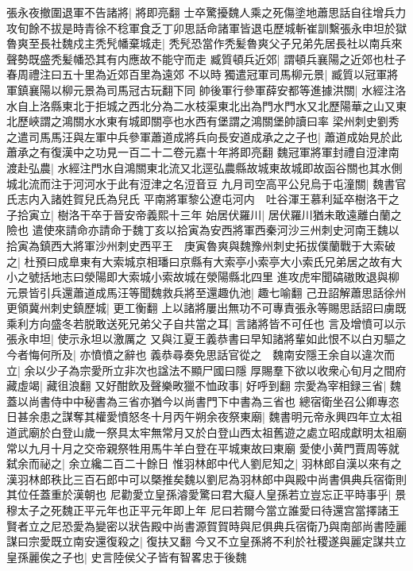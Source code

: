 張永夜撤圍退軍不告諸將|{
	將即亮翻}
士卒驚擾魏人乘之死傷塗地蕭思話自往增兵力攻旬餘不拔是時青徐不稔軍食乏丁卯思話命諸軍皆退屯歷城斬崔訓繫張永申坦於獄魯爽至長社魏戍主秃髠幡棄城走|{
	秃髠恐當作秃髪魯爽父子兄弟先居長社以南兵來聲勢既盛秃髪幡恐其有内應故不能守而走}
臧質頓兵近郊|{
	謂頓兵襄陽之近郊也杜子春周禮注曰五十里為近郊百里為遠郊}
不以時獨遣冠軍司馬柳元景|{
	臧質以冠軍將軍鎮襄陽以柳元景為司馬冠古玩翻下同}
帥後軍行參軍薛安都等進據洪關|{
	水經注洛水自上洛縣東北于拒城之西北分為二水枝渠東北出為門水門水又北歷陽華之山又東北歷峽謂之鴻關水水東有城即關亭也水西有堡謂之鴻關堡帥讀曰率}
梁州刺史劉秀之遣司馬馬汪與左軍中兵參軍蕭道成將兵向長安道成承之之子也|{
	蕭道成始見於此蕭承之有復漢中之功見一百二十二卷元嘉十年將即亮翻}
魏冠軍將軍封禮自浢津南渡赴弘農|{
	水經注門水自鴻關東北流又北逕弘農縣故城東故城即故函谷關也其水側城北流而注于河河水于此有浢津之名浢音豆}
九月司空高平公兒烏于屯潼關|{
	魏書官氏志内入諸姓賀兒氏為兒氏}
平南將軍黎公遼屯河内　吐谷渾王慕利延卒樹洛干之子拾寅立|{
	樹洛干卒于晉安帝義熙十三年}
始居伏羅川|{
	居伏羅川猶未敢遠離白蘭之險也}
遣使來請命亦請命于魏丁亥以拾寅為安西將軍西秦河沙三州刺史河南王魏以拾寅為鎮西大將軍沙州刺史西平王　庚寅魯爽與魏豫州刺史拓拔僕蘭戰于大索破之|{
	杜預曰成臯東有大索城京相璠曰京縣有大索亭小索亭大小索氏兄弟居之故有大小之號括地志曰滎陽即大索城小索故城在滎陽縣北四里}
進攻虎牢聞碻磝敗退與柳元景皆引兵還蕭道成馬汪等聞魏救兵將至還趣仇池|{
	趣七喻翻}
己丑詔解蕭思話徐州更領冀州刺史鎮歷城|{
	更工衡翻}
上以諸將屢出無功不可專責張永等賜思話詔曰虜既乘利方向盛冬若脱敢送死兄弟父子自共當之耳|{
	言諸將皆不可任也}
言及增憤可以示張永申坦|{
	使示永坦以激厲之}
又與江夏王義恭書曰早知諸將輩如此恨不以白刃驅之今者悔何所及|{
	亦憤憤之辭也}
義恭尋奏免思話官從之　魏南安隱王余自以違次而立|{
	余以少子為宗愛所立非次也諡法不顯尸國曰隱}
厚賜羣下欲以收衆心旬月之間府藏虛竭|{
	藏徂浪翻}
又好酣飲及聲樂畋獵不恤政事|{
	好呼到翻}
宗愛為宰相録三省|{
	魏蓋以尚書侍中中秘書為三省亦猶今以尚書門下中書為三省也}
總宿衛坐召公卿專恣日甚余患之謀奪其權愛憤怒冬十月丙午朔余夜祭東廟|{
	魏書明元帝永興四年立太祖道武廟於白登山歲一祭具太牢無常月又於白登山西太祖舊遊之處立昭成獻明太祖廟常以九月十月之交帝親祭牲用馬牛羊白登在平城東故曰東廟}
愛使小黄門賈周等就弑余而祕之|{
	余立纔二百二十餘日}
惟羽林郎中代人劉尼知之|{
	羽林郎自漢以來有之漢羽林郎秩比三百石郎中可以槩推矣魏以劉尼為羽林郎中與殿中尚書俱典兵宿衛則其位任蓋重於漢朝也}
尼勸愛立皇孫濬愛驚曰君大癡人皇孫若立豈忘正平時事乎|{
	景穆太子之死魏正平元年也正平元年即上年}
尼曰若爾今當立誰愛曰待還宫當擇諸王賢者立之尼恐愛為變密以狀告殿中尚書源賀賀時與尼俱典兵宿衛乃與南部尚書陸麗謀曰宗愛既立南安還復殺之|{
	復扶又翻}
今又不立皇孫將不利於社稷遂與麗定謀共立皇孫麗俟之子也|{
	史言陸侯父子皆有智畧忠于後魏}
